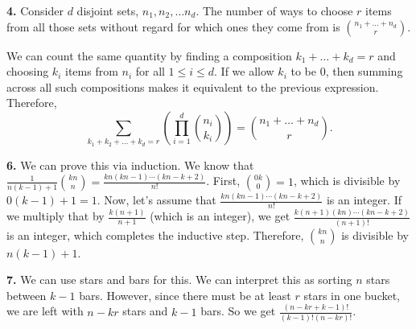 \documentclass{article}
\begin{document}
\textbf{4.} Consider $d$ disjoint sets, $n_1, n_2, \ldots n_d$. The number of ways to choose $r$ items from all those sets without regard for which ones they come from is ${n_1 + \ldots + n_d}\choose {r}$.
\newline

We can count the same quantity by finding a composition $k_1 + \ldots + k_d = r$ and choosing $k_i$ items from $n_i$ for all $1 \le i \le d$. If we allow $k_i$ to be $0$, then summing across all such compositions makes it equivalent to the previous expression. Therefore, $$\displaystyle \sum_{k_1 + k_2 + \ldots + k_d = r}\left(\prod_{i = 1}^d{n_i\choose k_i}\right) = {{n_1 + \ldots + n_d}\choose r}.$$
\newline

\textbf{6.} We can prove this via induction. We know that $\frac{1}{n(k - 1) + 1}{{kn}\choose n} = \frac{kn(kn - 1)\cdots(kn - k + 2)}{n!}$. First, ${{0k}\choose 0} = 1$, which is divisible by $0(k - 1) + 1 = 1$. Now, let's assume that $\frac{kn(kn - 1)\cdots(kn - k + 2)}{n!}$ is an integer. If we multiply that by $\frac{k(n + 1)}{n + 1}$ (which is an integer), we get $\frac{k(n + 1)(kn)\cdots(kn - k + 2)}{(n + 1)!}$ is an integer, which completes the inductive step. Therefore, ${kn}\choose n$ is divisible by $n(k - 1) + 1$.
\newline

\textbf{7.} We can use stars and bars for this. We can interpret this as sorting $n$ stars between $k - 1$ bars. However, since there must be at least $r$ stars in one bucket, we are left with $n - kr$ stars and $k - 1$ bars. So we get $\frac{(n - kr + k - 1)!}{(k - 1)!(n - kr)!}$.
\end{document}
